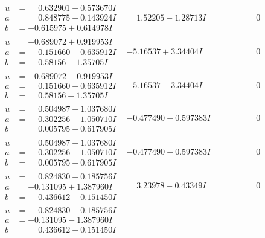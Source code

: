 \documentclass[1p]{elsarticle_modified}
\theoremstyle{definition}
\begin{document}
$$\begin{array}{c|c|c}
\begin{aligned}
u &= \phantom{-}0.632901 - 0.573670 I \\
a &= \phantom{-}0.848775 + 0.143924 I \\
b &= -0.615975 + 0.614978 I\end{aligned}
 & \phantom{-}1.52205 - 1.28713 I & \phantom{-0.000000 } 0 \\ \hline\begin{aligned}
u &= -0.689072 + 0.919953 I \\
a &= \phantom{-}0.151660 + 0.635912 I \\
b &= \phantom{-}0.58156 + 1.35705 I\end{aligned}
 & -5.16537 + 3.34404 I & \phantom{-0.000000 } 0 \\ \hline\begin{aligned}
u &= -0.689072 - 0.919953 I \\
a &= \phantom{-}0.151660 - 0.635912 I \\
b &= \phantom{-}0.58156 - 1.35705 I\end{aligned}
 & -5.16537 - 3.34404 I & \phantom{-0.000000 } 0 \\ \hline\begin{aligned}
u &= \phantom{-}0.504987 + 1.037680 I \\
a &= \phantom{-}0.302256 - 1.050710 I \\
b &= \phantom{-}0.005795 - 0.617905 I\end{aligned}
 & -0.477490 - 0.597383 I & \phantom{-0.000000 } 0 \\ \hline\begin{aligned}
u &= \phantom{-}0.504987 - 1.037680 I \\
a &= \phantom{-}0.302256 + 1.050710 I \\
b &= \phantom{-}0.005795 + 0.617905 I\end{aligned}
 & -0.477490 + 0.597383 I & \phantom{-0.000000 } 0 \\ \hline\begin{aligned}
u &= \phantom{-}0.824830 + 0.185756 I \\
a &= -0.131095 + 1.387960 I \\
b &= \phantom{-}0.436612 - 0.151450 I\end{aligned}
 & \phantom{-}3.23978 - 0.43349 I & \phantom{-0.000000 } 0 \\ \hline\begin{aligned}
u &= \phantom{-}0.824830 - 0.185756 I \\
a &= -0.131095 - 1.387960 I \\
b &= \phantom{-}0.436612 + 0.151450 I\end{aligned}

\end{array}$$
\end{document}

